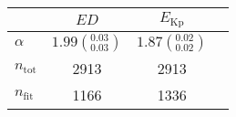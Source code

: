 \begin{tabular}{lccr}
\hline
  &                               $ED$ &                                    $E_\mathrm{Kp}$ \\
\hline
$\alpha$            &  $1.99\left(^{0.03}_{0.03}\right)$ &                  $1.87\left(^{0.02}_{0.02}\right)$ \\
$n_\mathrm{tot}$    &                               2913 &                                               2913 \\
$n_\mathrm{fit}$    &                               1166 &                                               1336 \\
\hline

\end{tabular}
